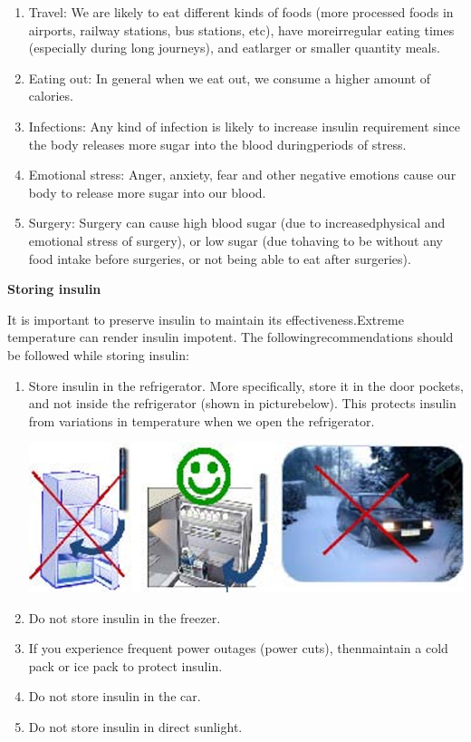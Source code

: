 \vspace{-\topsep}
\begin{enumerate}[•]
\itemsep=0pt
\item Travel: We are likely to eat different kinds of foods (more processed foods in airports, railway stations, bus stations, etc), have more\break irregular eating times (especially during long journeys), and eat\break larger or smaller quantity meals.
\item Eating out: In general when we eat out, we consume a higher amount of calories.
\item Infections: Any kind of infection is likely to increase insulin requirement since the body releases more sugar into the blood during\break periods of stress.
\item Emotional stress: Anger, anxiety, fear and other negative emotions cause our body to release more sugar into our blood.
\item Surgery: Surgery can cause high blood sugar (due to increased\break physical and emotional stress of surgery), or low sugar (due to\break having to be without any food intake before surgeries, or not being able to eat after surgeries).
\end{enumerate}
\vspace{-\topsep}

\noindent\textbf{Storing insulin}

It is important to preserve insulin to maintain its effectiveness.\break Extreme temperature can render insulin impotent. The following\break recommendations should be followed while storing insulin:

\vspace{-\topsep}
\begin{enumerate}[•]
\itemsep=0pt
\item Store insulin in the refrigerator. More specifically, store it in the door pockets, and not inside the refrigerator (shown in picture\break below). This protects insulin from variations in temperature when we open the refrigerator.

\includegraphics[scale=2.3]{images/090.jpg}

\item Do not store insulin in the freezer.
\item If you experience frequent power outages (power cuts), then\break maintain a cold pack or ice pack to protect insulin.
\item Do not store insulin in the car.
\item Do not store insulin in direct sunlight.
\end{enumerate}
\vspace{-\topsep}

